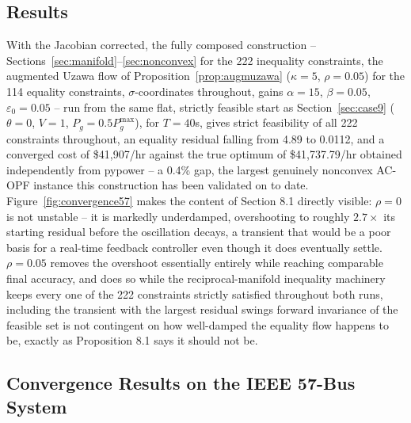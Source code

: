 \documentclass[11pt,onecolumn]{article}
\theoremstyle{definition}
\theoremstyle{remark}
\begin{document}
\subsection{Results}
With the Jacobian corrected, the fully composed construction -- Sections~\ref{sec:manifold}--\ref{sec:nonconvex}
for the 222 inequality constraints, the augmented Uzawa flow of Proposition~\ref{prop:augmuzawa}
($\kappa = 5$, $\rho = 0.05$) for the 114 equality constraints, $\sigma$-coordinates throughout,
gains $\alpha = 15$, $\beta = 0.05$, $\varepsilon_0 = 0.05$ -- run from the same flat, strictly
feasible start as Section~\ref{sec:case9} ($\theta = 0$, $V = 1$, $P_g = 0.5 P_g^{\max}$), for
$T = 40$s, gives strict feasibility of all 222 constraints throughout, an equality residual
falling from 4.89 to 0.0112, and a converged cost of \$41{,}907/hr against the true optimum of
\$41{,}737.79/hr obtained independently from pypower -- a 0.4\% gap, the largest genuinely
nonconvex AC-OPF instance this construction has been validated on to date.
Figure~\ref{fig:convergence57} makes the content of Section 8.1 directly visible: $\rho = 0$ is
not unstable -- it is markedly underdamped, overshooting to roughly $2.7\times$ its starting
residual before the oscillation decays, a transient that would be a poor basis for a real-time
feedback controller even though it does eventually settle. $\rho = 0.05$ removes the overshoot
essentially entirely while reaching comparable final accuracy, and does so while the
reciprocal-manifold inequality machinery keeps every one of the 222 constraints strictly
satisfied throughout both runs, including the transient with the largest residual swings forward invariance of the feasible set is not contingent on how well-damped the equality flow
happens to be, exactly as Proposition 8.1 says it should not be. 


\subsection{Convergence Results on the IEEE 57-Bus System}
\end{document}
